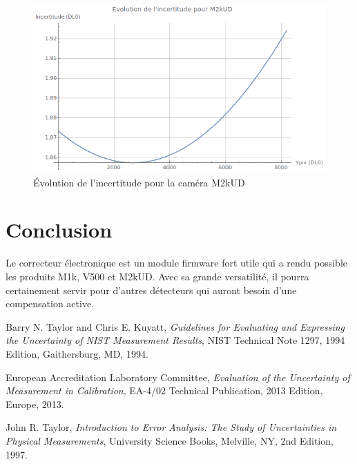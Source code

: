 \documentclass[11pt]{report}
\begin{document}
\begin{figure}[ht]
  \centering
  \includegraphics[width=1.0\textwidth]{Plot_M2kUD}
  \caption{Évolution de l'incertitude pour la caméra M2kUD}
  \label{fig:Plot_M2kUD}
\end{figure}
\pagebreak

\section{Conclusion}
Le correcteur électronique est un module firmware fort utile qui a rendu possible les produits M1k, V500 et M2kUD. Avec sa grande versatilité, il pourra certainement servir pour d'autres détecteurs qui auront besoin d'une compensation active.


\begin{thebibliography}{9}
	Barry N. Taylor and Chris E. Kuyatt,
	\textit{Guidelines for Evaluating and Expressing the Uncertainty of NIST Measurement Results},
     NIST Technical Note 1297,
     1994 Edition,
     Gaithersburg, MD, 
     1994.

	European Accreditation Laboratory Committee,
	\textit{Evaluation of the Uncertainty of Measurement in Calibration},
     EA-4/02 Technical Publication,
     2013 Edition,
     Europe, 
     2013.

	John R. Taylor,
	\textit{Introduction to Error Analysis: The Study of Uncertainties in Physical Measurements},
	University Science Books, Melville, NY,
	2nd Edition,
	1997.
\end{thebibliography}
\end{document}
